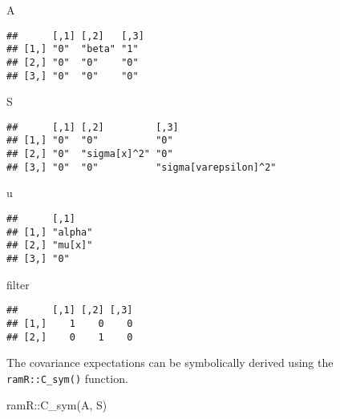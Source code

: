 \documentclass[
]{book}
\newenvironment{Shaded}{\begin{snugshade}}{\end{snugshade}}
\newcommand{\FunctionTok}[1]{\textcolor[rgb]{0.00,0.00,0.00}{#1}}
\newcommand{\NormalTok}[1]{#1}
\newcommand{\SpecialCharTok}[1]{\textcolor[rgb]{0.00,0.00,0.00}{#1}}
\theoremstyle{definition}
\theoremstyle{definition}
\theoremstyle{definition}
\theoremstyle{remark}
\begin{document}
\begin{Shaded}
\begin{Highlighting}[]
\NormalTok{A}
\end{Highlighting}
\end{Shaded}

\begin{verbatim}
##      [,1] [,2]   [,3]
## [1,] "0"  "beta" "1" 
## [2,] "0"  "0"    "0" 
## [3,] "0"  "0"    "0"
\end{verbatim}

\begin{Shaded}
\begin{Highlighting}[]
\NormalTok{S}
\end{Highlighting}
\end{Shaded}

\begin{verbatim}
##      [,1] [,2]         [,3]                 
## [1,] "0"  "0"          "0"                  
## [2,] "0"  "sigma[x]^2" "0"                  
## [3,] "0"  "0"          "sigma[varepsilon]^2"
\end{verbatim}

\begin{Shaded}
\begin{Highlighting}[]
\NormalTok{u}
\end{Highlighting}
\end{Shaded}

\begin{verbatim}
##      [,1]   
## [1,] "alpha"
## [2,] "mu[x]"
## [3,] "0"
\end{verbatim}

\begin{Shaded}
\begin{Highlighting}[]
\NormalTok{filter}
\end{Highlighting}
\end{Shaded}

\begin{verbatim}
##      [,1] [,2] [,3]
## [1,]    1    0    0
## [2,]    0    1    0
\end{verbatim}

The covariance expectations
can be symbolically derived using the \texttt{ramR::C\_sym()} function.

\begin{Shaded}
\begin{Highlighting}[]
\NormalTok{ramR}\SpecialCharTok{::}\FunctionTok{C\_sym}\NormalTok{(A, S)}
\end{Highlighting}
\end{Shaded}
\end{document}
